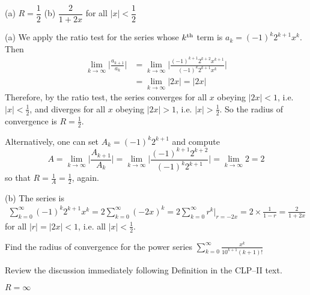 \begin{answer}
(a) $R = \dfrac{1}{2}$\qquad
(b) $\dfrac{2}{1+2x}$ for all $|x|<\dfrac{1}{2}$
\end{answer}

\begin{solution} (a)
We apply the ratio test for the series whose $k^{\rm th}$
term is $a_k= (-1)^k 2^{k+1} x^k$. Then
\begin{align*}
\lim_{k\to\infty} \bigg| \frac{ a_{k+1} }{ a_k } \bigg|
&= \lim_{k\to\infty} \bigg| \frac{(-1)^{k+1} 2^{k+2} x^{k+1}}
                            {(-1)^k 2^{k+1} x^k} \bigg| \\
&= \lim_{k\to\infty}|2x| = |2x|
\end{align*}
Therefore, by the ratio test, the series converges for all $x$
obeying $|2x|<1$, i.e. $|x|<\frac{1}{2}$, and diverges for all $x$
obeying $|2x|>1$, i.e. $|x|>\frac{1}{2}$.
So the radius of convergence is $R = \frac{1}{2}$.

Alternatively, one can set $A_k = (-1)^k 2^{k+1}$ and compute
\begin{equation*}
A = \lim_{k\to\infty} \bigg| \frac{A_{k+1}}{A_k}\bigg|
  = \lim_{k\to\infty} \bigg| \frac{(-1)^{k+1} 2^{k+2}}{(-1)^k 2^{k+1}}\bigg|
  = \lim_{k\to\infty} 2
  =2
\end{equation*}
so that $R=\frac{1}{A}=\frac{1}{2}$, again.

\noindent (b) The series is
\begin{align*}
\sum_{k=0}^\infty (-1)^k 2^{k+1} x^k
=2 \sum_{k=0}^\infty (-2x)^k
=2\sum_{k=0}^\infty r^k\Big|_{r=-2x}
=2\times\frac{1}{1-r}
=\frac{2}{1+2x}
\end{align*}
for all $|r|=|2x|<1$, i.e. all $|x|<\frac{1}{2}$.


\end{solution}



\begin{Mquestion}[M105 2014A]
Find the radius of convergence for the power series
$\displaystyle\sum_{k=0}^\infty \frac{x^k}{10^{k+1}(k+1)!}$
\end{Mquestion}

\begin{hint}
Review the discussion immediately following Definition
 in the
CLP--II text.
\end{hint}

\begin{answer}
$R = \infty$
\end{answer}

